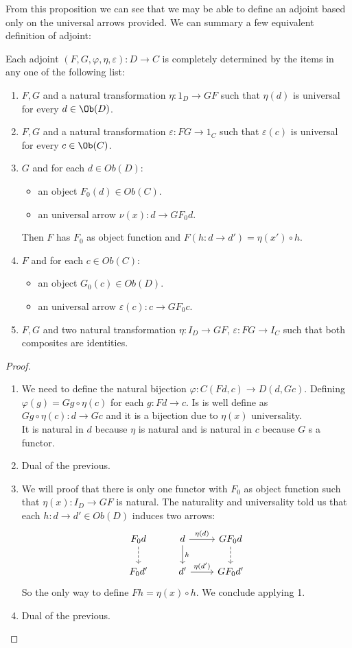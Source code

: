 From this proposition we can see that we may be able to define an adjoint based only on the universal arrows provided. We can summary a few equivalent definition of adjoint:
\begin{proposition}
  Each adjoint $(F,G,\varphi,\eta,\varepsilon):D\to C$ is completely determined by the items in any one of the following list:
  \begin{enumerate}
  \item $F,G$ and a natural transformation $\eta:1_D\to GF$ such that $\eta(d)$ is universal for every $d\in \Ob(D)$.
  \item $F,G$ and a natural transformation $\varepsilon:FG\to 1_C$ such that $\varepsilon(c)$ is universal for every $c\in \Ob(C)$.
  \item $G$ and for each $d\in Ob(D)$:
    \begin{itemize}
    \item an object $F_0(d)\in Ob(C)$.
    \item an universal arrow $\nu(x):d \to GF_0 d$.
    \end{itemize}
    Then $F$ has $F_0$ as object function and $F(h:d\to d') = \eta(x')\circ h$.
  \item $F$ and for each $c\in Ob(C)$:
    \begin{itemize}
    \item an object $G_0(c)\in Ob(D)$.
    \item an universal arrow $\varepsilon(c):c \to GF_0 c$.
    \end{itemize}
  \item  $F,G$ and two natural transformation $\eta: I_D\to GF$, $\varepsilon: FG\to I_C$ such that both composites are identities.
  \end{enumerate}
\end{proposition}
\begin{proof}
  \begin{enumerate}
    
  \item We need to define the natural bijection $\varphi: C(Fd,c)\to D(d,Gc)$. Defining  $\varphi(g) = Gg\circ \eta(c)$ for each $g:Fd \to c$. Is is well define as $Gg\circ \eta(c): d\to Gc$ and it is a bijection  due to $\eta(x)$ universality.\\

    It is natural in $d$ because $\eta$ is natural and is natural in $c$ because $G$ s a functor.
  \item Dual of the previous.
  \item We will proof that there is only one functor with $F_0$ as object function such that $\eta (x): I_D\to GF$ is natural. The naturality and universality told us that each $h:d\to d'\in Ob(D)$ induces two arrows:
\[
\begin{tikzcd}
  F_0 d\arrow[dashed]{d} & d\arrow{d}{h}\arrow{r}{\eta (d)}&GF_0d\arrow[dashed]{d}\\
  F_0 d'& d'\arrow{r}{\eta (d')} & GF_0d'
\end{tikzcd}
\]
    So the only way to define $Fh= \eta (x) \circ h$. We conclude applying 1.
  \item Dual of the previous.
  \end{enumerate}
\end{proof}
